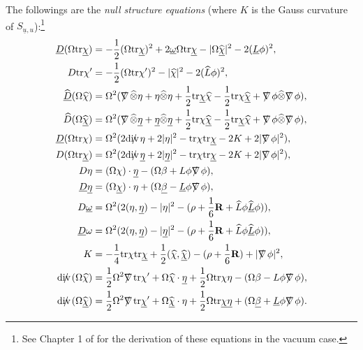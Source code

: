 \documentclass[11pt,reqno]{amsart}
\theoremstyle{definition}
\numberwithin{equation}{section}
\newcommand{\tr}{\mathrm{tr}}
\def\betab{\underline{\beta}}
\def\chib{\underline{\chi}}
\def\chibh{\widehat{\underline{\chi}}}
\def\chih{\widehat{\chi}}
\def\etab{\underline{\eta}}
\def\Lb{\underline{L}}
\def\tr{\mathrm{tr}}
\def\omegab{\underline{\omega}}
\def\tensor{\widehat{\otimes}}
\def\ub{\underline{u}}
\def\Lh{\widehat{L}}
\def\Lbh{\widehat{\underline{L}}}
\newcommand{\Db}{\underline{D}}
\newcommand{\Dh}{\widehat{D}}
\newcommand{\Dbh}{\widehat{\underline{D}}}
\def\nablas{\mbox{$\nabla \mkern -13mu /$ }}
\def\divs{\mbox{$\mathrm{div} \mkern -13mu /$ }}
\def\ds{\mbox{$\nabla \mkern -13mu /$ }}
\begin{document}
The followings are the \textit{null structure equations} (where  $K$ is the Gauss curvature of $S_{\ub,u}$):\footnote{See Chapter 1 of \cite{Chr} for the derivation of these equations in the vacuum case.}
\begin{align*}
\Db(\Omega\tr\chib)&=-\frac{1}{2}(\Omega\tr\chib)^2+2\omegab\Omega\tr\chib-|\Omega\chibh|^2-2(\Lb\phi)^2,\\
D\tr\chi'&=-\frac{1}{2}(\Omega\tr\chi')^2-|\chih|^2-2(\Lh\phi)^2,\\
\Dbh(\Omega\chih)&=\Omega^2(\nablas \tensor \eta + \eta \tensor \eta +\frac{1}{2}\tr\chib\chih-\frac{1}{2}\tr\chi \chibh+\ds\phi\tensor\ds\phi),\\
\Dh(\Omega\chibh)&=\Omega^2(\nablas \tensor \etab + \etab \tensor \etab +\frac{1}{2}\tr\chi\chibh-\frac{1}{2}\tr\chib \chih+\ds\phi\tensor\ds\phi),\\
\Db(\Omega\tr\chi)&=\Omega^2(2\divs\eta+2|\eta|^2-\tr\chi\tr\chib-2K+2|\ds\phi|^2),\\
D(\Omega\tr\chib)&=\Omega^2(2\divs\etab+2|\etab|^2-\tr\chi\tr\chib-2K+2|\ds\phi|^2),\\
D\eta &= (\Omega\chi)\cdot\etab-(\Omega\beta+L\phi\ds\phi),\\
\Db\etab &= (\Omega\chib) \cdot\eta+(\Omega\betab-\Lb\phi\ds\phi),\\
D  \omegab &=\Omega^2(2(\eta,\etab)-|\eta|^2-(\rho+\frac{1}{6}\mathbf{R}+\Lh\phi\Lbh\phi)),\\
\Db  \omega &=\Omega^2(2(\eta,\etab)-|\etab|^2-(\rho+\frac{1}{6}\mathbf{R}+\Lh\phi\Lbh\phi)),\\
K&=-\frac{1}{4}\tr \chi\tr\chib+\frac{1}{2}(\chih,\chibh)-(\rho+\frac{1}{6}\mathbf{R})+|\ds\phi|^2,\\
\divs(\Omega\chih)&=\frac{1}{2}\Omega^2\ds\tr \chi'+\Omega\chih\cdot\etab+\frac{1}{2}\Omega\tr \chi\eta-(\Omega\beta-L\phi\ds\phi),\\
\divs(\Omega\chibh)&=\frac{1}{2}\Omega^2\ds\tr \chib'+\Omega\chibh\cdot\eta+\frac{1}{2}\Omega\tr \chib\etab+(\Omega\betab+\Lb\phi\ds\phi).\\
\end{align*}
\end{document}
